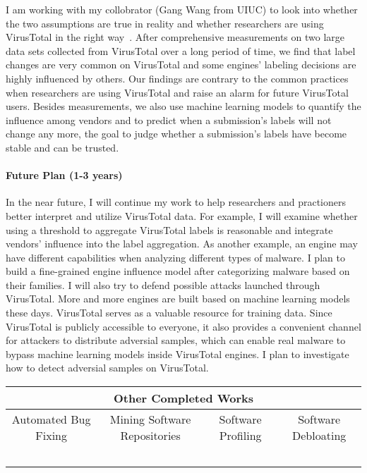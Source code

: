\documentclass[10pt]{article}
\begin{document}
I am working with my collobrator (Gang Wang from UIUC) to look into 
whether the two assumptions are true in reality
and whether researchers are using VirusTotal in the right way~\cite{vt-jianjun,imc-peng}. 
After comprehensive measurements on two large data sets collected from VirusTotal
over a long period of time, 
we find that label changes are very common on VirusTotal and 
some engines' labeling decisions are highly influenced by others. 
Our findings are contrary to the common practices when researchers are using VirusTotal
and raise an alarm for future VirusTotal users. 
Besides measurements, we also use machine learning models to quantify the influence 
among vendors and to predict when a submission's labels will not change any more, 
the goal to judge whether a submission's labels have become stable and can be trusted. 

\vspace{-.1in}
\paragraph{Future Plan (1-3 years)}
In the near future, I will continue my work to help researchers and practioners 
better interpret and utilize VirusTotal data. 
For example, I will examine whether using a threshold to aggregate VirusTotal labels   
is reasonable and integrate vendors' influence into the label aggregation. 
As another example, an engine may have different capabilities when analyzing 
different types of malware. I plan to build a fine-grained 
engine influence model after categorizing malware based on their families. 
I will also try to defend possible attacks launched through VirusTotal. 
More and more engines are built based on machine learning models these days. 
VirusTotal serves as a valuable resource for training data.
Since VirusTotal is publicly accessible to everyone, it also provides 
a convenient channel for attackers to distribute adversial samples, 
which can enable real malware to bypass machine learning models inside VirusTotal engines.
I plan to investigate how to detect adversial samples on VirusTotal.  

\begin{table*}[th]
\centering
\begin{tabular}{|c|c|c|c|}
\hline
						\multicolumn{4}{|c|}{\textbf{Other Completed Works}}  \\ \hline
\multicolumn{1}{|c|}{Automated Bug Fixing}   & \multicolumn{1}{c|}{Mining Software Repositories} & \multicolumn{1}{c|}{Software Profiling} 		& \multicolumn{1}{c|}{Software Debloating} \\ \hline
 				~\cite{jin11afix}	   	    &              ~\cite{Gu15FSE}                                     &         ~\cite{icse-boqin}                              &  ~\cite{bangwen}~\cite{salad}        \\ \hline
\end{tabular}
\end{table*}
\end{document}
